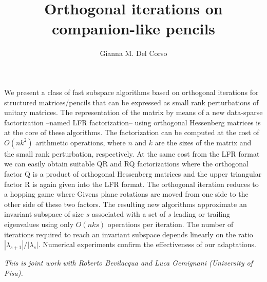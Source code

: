 \documentclass[a4paper]{amsart}
\date{}
\begin{document}
\title{Orthogonal iterations on companion-like pencils}
\author{Gianna M. Del Corso} %
\address{University of Pisa} %

\maketitle


We present a class of fast subspace algorithms based on orthogonal iterations for structured matrices/pencils that can be expressed as small rank perturbations of unitary matrices. 
          The  representation of the matrix   by means of a new data-sparse  factorization --named LFR factorization-- using orthogonal Hessenberg matrices is at the core of these algorithms.  The factorization can be computed at the cost of $O(n k^2)$ arithmetic operations,  where $n$ and $k$ are the sizes of the matrix  and the small rank perturbation, respectively.  At the same cost from the LFR format  we can easily  obtain  suitable QR and RQ factorizations  where  the orthogonal factor Q is a product of orthogonal Hessenberg matrices and  the upper triangular factor R is again given into the LFR format.  The orthogonal iteration reduces  to a hopping game where Givens plane rotations are moved from one side to  the other side of these  two factors.
          The resulting  new algorithms approximate an invariant subspace of size $s$ associated with a set of $s$ leading or trailing eigenvalues using only 
          $O(nks)$ operations per iteration.  The number of iterations required to reach an invariant subspace depends linearly on the ratio $|\lambda_{s+1}|/|\lambda_s|$.
         Numerical experiments confirm the effectiveness of our adaptations.
         
\emph{This is joint work with Roberto Bevilacqua and Luca Gemignani (University of Pisa).}
\end{document}
